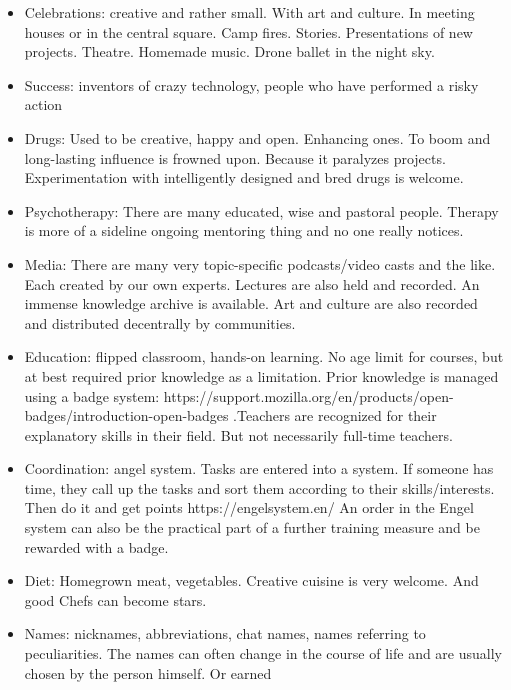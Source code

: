 \begin{itemize}
    \item Celebrations: creative and rather small. With art and culture. In meeting houses or in the central square. Camp fires. Stories. Presentations of new projects. Theatre. Homemade music. Drone ballet in the night sky.
    \item Success: inventors of crazy technology, people who have performed a risky action
    \item Drugs: Used to be creative, happy and open. Enhancing ones. To boom and long-lasting influence is frowned upon. Because it paralyzes projects. Experimentation with intelligently designed and bred drugs is welcome.
    \item Psychotherapy: There are many educated, wise and pastoral people. Therapy is more of a sideline ongoing mentoring thing and no one really notices.
    \item Media: There are many very topic-specific podcasts/video casts and the like. Each created by our own experts. Lectures are also held and recorded. An immense knowledge archive is available. Art and culture are also recorded and distributed decentrally by communities.
    \item Education: flipped classroom, hands-on learning. No age limit for courses, but at best required prior knowledge as a limitation. Prior knowledge is managed using a badge system: https://support.mozilla.org/en/products/open-badges/introduction-open-badges .Teachers are recognized for their explanatory skills in their field. But not necessarily full-time teachers.
    \item Coordination: angel system. Tasks are entered into a system. If someone has time, they call up the tasks and sort them according to their skills/interests. Then do it and get points https://engelsystem.en/ An order in the Engel system can also be the practical part of a further training measure and be rewarded with a badge.
    \item Diet: Homegrown meat, vegetables. Creative cuisine is very welcome. And good Chefs can become stars.
    \item Names: nicknames, abbreviations, chat names, names referring to peculiarities. The names can often change in the course of life and are usually chosen by the person himself. Or earned
\end{itemize}

